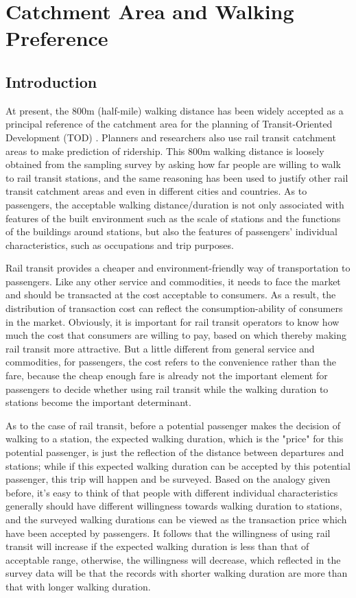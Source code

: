 \chapter{Catchment Area and Walking Preference}
%
\section{Introduction}
At present, the 800m (half-mile) walking distance has been widely accepted as a principal reference of the catchment area for the planning of Transit-Oriented Development (TOD) \cite{kuby2004factors,gutierrez2011transit,cardozo2012application,zhao2013influences}. Planners and researchers also use rail transit catchment areas to make prediction of ridership. This 800m walking distance is loosely obtained from the sampling survey by asking how far people are willing to walk to rail transit stations, and the same reasoning has been used to justify other rail transit catchment areas and even in different cities and countries. As to passengers, the acceptable walking distance/duration is not only associated with features of the built environment such as the scale of stations and the functions of the buildings around stations, but also the features of passengers' individual characteristics, such as occupations and trip purposes.

%
Rail transit provides a cheaper and environment-friendly way of transportation to passengers. Like any other service and commodities, it needs to face the market and should be transacted at the cost acceptable to consumers. As a result, the distribution of transaction cost can reflect the consumption-ability of consumers in the market. Obviously, it is important for rail transit operators to know how much the cost that consumers are willing to pay, based on which thereby making rail transit more attractive. But a little different from general service and commodities, for passengers, the cost refers to the convenience rather than the fare, because the cheap enough fare is already not the important element for passengers to decide whether using rail transit while the walking duration to stations become the important determinant.

%
As to the case of rail transit, before a potential passenger makes the decision of walking to a station, the expected walking duration, which is the "price" for this potential passenger, is just the reflection of the distance between departures and stations; while if this expected walking duration can be accepted by this potential passenger, this trip will happen and be surveyed. Based on the analogy given before, it's easy to think of that people with different individual characteristics generally should have different willingness towards walking duration to stations, and the surveyed walking durations can be viewed as the transaction price which have been accepted by passengers. It follows that the willingness of using rail transit will increase if the expected walking duration is less than that of acceptable range, otherwise, the willingness will decrease, which reflected in the survey data will be that the records with shorter walking duration are more than that with longer walking duration. 

